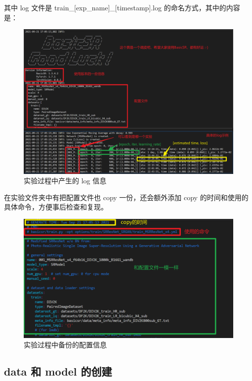 \documentclass[../main.tex]{subfiles}
\begin{document}
\begin{enumerate}
其中 log 文件是 train\_[exp\_name]\_[timestamp].log 的命名方式，其中的内容是：

\begin{figure}[H]
\begin{center}
    \includegraphics[width=0.7\linewidth]{figures/getting_start_6.png}
    \caption{实验过程中产生的 log 信息}
    \label{fig:getting_start_6}
\end{center}
\vspace{-0.5cm}
\end{figure}

在实验文件夹中有把配置文件也 copy 一份，还会额外添加 copy 的时间和使用的具体命令，方便事后检查和复现。

\begin{figure}[H]
\begin{center}
    \includegraphics[width=0.7\linewidth]{figures/getting_start_7.png}
    \caption{实验过程中备份的配置信息}
    \label{fig:getting_start_7}
\end{center}
\vspace{-0.5cm}
\end{figure}

\end{enumerate}

\subsection{data 和 model 的创建}
\end{document}

